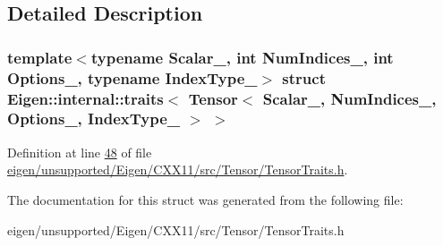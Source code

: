 \subsection{Detailed Description}
\subsubsection*{template$<$typename Scalar\+\_\+, int Num\+Indices\+\_\+, int Options\+\_\+, typename Index\+Type\+\_\+$>$\newline
struct Eigen\+::internal\+::traits$<$ Tensor$<$ Scalar\+\_\+, Num\+Indices\+\_\+, Options\+\_\+, Index\+Type\+\_\+ $>$ $>$}



Definition at line \hyperlink{eigen_2unsupported_2_eigen_2_c_x_x11_2src_2_tensor_2_tensor_traits_8h_source_l00048}{48} of file \hyperlink{eigen_2unsupported_2_eigen_2_c_x_x11_2src_2_tensor_2_tensor_traits_8h_source}{eigen/unsupported/\+Eigen/\+C\+X\+X11/src/\+Tensor/\+Tensor\+Traits.\+h}.



The documentation for this struct was generated from the following file\+:\begin{DoxyCompactItemize}
\item 
eigen/unsupported/\+Eigen/\+C\+X\+X11/src/\+Tensor/\+Tensor\+Traits.\+h\end{DoxyCompactItemize}
